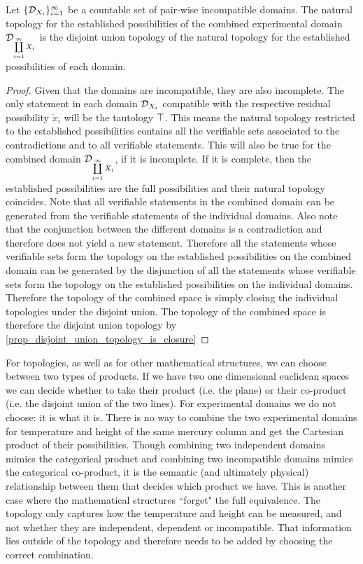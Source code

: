 \documentclass[11pt,letterpaper,fleqn]{memoir} %
\begin{document}
\begin{mathSection}
	\begin{prop}
		Let $\{\mathcal{D}_{X_i}\}_{i=1}^{\infty}$ be a countable set of pair-wise incompatible domains. The natural topology for the established possibilities of the combined experimental domain $\mathcal{D}_{\coprod\limits_{i=1}^{\infty} X_i}$ is the disjoint union topology of the natural topology for the established possibilities of each domain.
	\end{prop}
	\begin{proof}
		Given that the domains are incompatible, they are also incomplete. The only statement in each domain $\mathcal{D}_{X_i}$ compatible with the respective residual possibility $\mathring{x}_i$ will be the tautology $\top$. This means the natural topology restricted to the established possibilities contains all the verifiable sets associated to the contradictions and to all verifiable statements. This will also be true for the combined domain $\mathcal{D}_{\coprod\limits_{i=1}^{\infty} X_i}$, if it is incomplete. If it is complete, then the established possibilities are the full possibilities and their natural topology coincides. Note that all verifiable statements in the combined domain can be generated from the verifiable statements of the individual domains. Also note that the conjunction between the different domains is a contradiction and therefore does not yield a new statement. Therefore all the statements whose verifiable sets form the topology on the established possibilities on the combined domain can be generated by the disjunction of all the statements whose verifiable sets form  the topology on the established possibilities on the individual domains. Therefore the topology of the combined space is simply closing the individual topologies under the disjoint union. The topology of the combined space is therefore the disjoint union topology by \ref{prop_disjoint_union_topology_is_closure}
	\end{proof}
\end{mathSection}

For topologies, as well as for other mathematical structures, we can choose between two types of products. If we have two one dimensional euclidean spaces we can decide whether to take their product (i.e. the plane) or their co-product (i.e. the disjoint union of the two lines). For experimental domains we do not choose: it is what it is. There is no way to combine the two experimental domains for temperature and height of the same mercury column and get the Cartesian product of their possibilities. Though combining two independent domains mimics the categorical product and combining two incompatible domains mimics the categorical co-product, it is the semantic (and ultimately physical) relationship between them that decides which product we have. This is another case where the mathematical structures ``forget" the full equivalence. The topology only captures how the temperature and height can be measured, and not whether they are independent, dependent or incompatible. That information lies outside of the topology and therefore needs to be added by choosing the correct combination.
\end{document}
